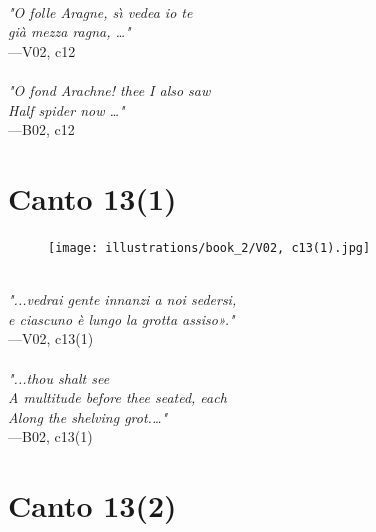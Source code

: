 \documentclass[../Dore_vision.tex]{subfiles}
\begin{document}
\begin{center}
\begin{minipage}{0.8\linewidth}
\textit{\\
"O folle Aragne, s\`{\i} vedea io te\\già mezza ragna, …"} \\
—V02, c12 \\~\\
\textit{"O fond Arachne! thee I also saw\\Half spider now …"} \\
—B02, c12
\end{minipage}
\end{center}

\newpage

\section{Canto 13(1)}

\begin{figure}[ht]
\centering
\texttt{[image: illustrations/book\_2/V02, c13(1).jpg]}
\end{figure}

\begin{center}
\begin{minipage}{0.8\linewidth}
\textit{\\
"...vedrai gente innanzi a noi sedersi,\\e ciascuno è lungo la grotta assiso»."} \\
—V02, c13(1) \\~\\
\textit{"...thou shalt see\\A multitude before thee seated, each\\Along the shelving grot.\textquotesingle…"} \\
—B02, c13(1)
\end{minipage}
\end{center}

\newpage

\section{Canto 13(2)}
\end{document}
